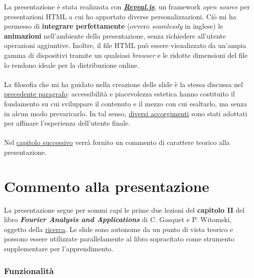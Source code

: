 \documentclass[
]{book}
\begin{document}
La presentazione è stata realizzata con \href{https://revealjs.com/}{\emph{\textbf{Reveal.js}}}, un framework \emph{open source} per presentazioni HTML a cui ho apportato diverse personalizzazioni.
Ciò mi ha permesso di \textbf{integrare perfettamente} (ovvero \emph{seamlessly} in inglese) le \textbf{animazioni} nell'ambiente della presentazione, senza richiedere all'utente operazioni aggiuntive. Inoltre, il file HTML può essere visualizzato da un'ampia gamma di dispositivi tramite un qualsiasi \emph{browser} e le ridotte dimensioni del file lo rendono ideale per la distribuzione online.

\hypertarget{filosofia}{%
\subsubsection*{}\label{filosofia}}

La filosofia che mi ha guidato nella creazione delle slide è la stessa discussa nel \protect\hyperlink{animazioni}{precedente paragrafo}: accessibilità e piacevolezza estetica hanno costituito il fondamento su cui sviluppare il contenuto e il mezzo con cui esaltarlo, ma senza in alcun modo prevaricarlo. In tal senso, \protect\hyperlink{features}{diversi accorgimenti} sono stati adottati per affinare l'esperienza dell'utente finale.

\hypertarget{section}{%
\subsubsection*{}\label{section}}

Nel \protect\hyperlink{commento}{capitolo successivo} verrà fornito un commento di carattere teorico alla presentazione.

\hypertarget{commento}{%
\chapter{Commento alla presentazione}\label{commento}}

La presentazione segue per sommi capi le prime due lezioni del \textbf{capitolo II} del libro \emph{\textbf{Fourier Analysis and Applications}} di C. Gasquet e P. Witomski, oggetto della \protect\hyperlink{ricerca}{ricerca}. Le slide sono autonome da un punto di vista teorico e possono essere utilizzate parallelamente al libro sopracitato come strumento supplementare per l'apprendimento.

\hypertarget{features}{%
\subsection*{Funzionalità}\label{features}}
\end{document}

